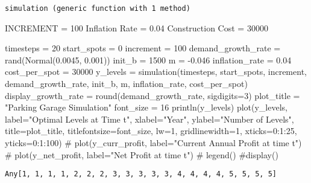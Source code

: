 \documentclass[
  letterpaper,
  DIV=11,
  numbers=noendperiod]{scrartcl}
\newenvironment{Shaded}{\begin{snugshade}}{\end{snugshade}}
\newcommand{\CommentTok}[1]{\textcolor[rgb]{0.37,0.37,0.37}{#1}}
\newcommand{\FloatTok}[1]{\textcolor[rgb]{0.68,0.00,0.00}{#1}}
\newcommand{\FunctionTok}[1]{\textcolor[rgb]{0.28,0.35,0.67}{#1}}
\newcommand{\NormalTok}[1]{\textcolor[rgb]{0.00,0.23,0.31}{#1}}
\newcommand{\OperatorTok}[1]{\textcolor[rgb]{0.37,0.37,0.37}{#1}}
\newcommand{\StringTok}[1]{\textcolor[rgb]{0.13,0.47,0.30}{#1}}
\begin{document}
\begin{verbatim}
simulation (generic function with 1 method)
\end{verbatim}

INCREMENT = 100 Inflation Rate = 0.04 Construction Cost = 30000

\begin{Shaded}
\begin{Highlighting}[]
\NormalTok{timesteps }\OperatorTok{=} \FloatTok{20} 
\NormalTok{start\_spots }\OperatorTok{=} \FloatTok{0}
\NormalTok{increment }\OperatorTok{=} \FloatTok{100}
\NormalTok{demand\_growth\_rate }\OperatorTok{=} \FunctionTok{rand}\NormalTok{(}\FunctionTok{Normal}\NormalTok{(}\FloatTok{0.0045}\NormalTok{, }\FloatTok{0.001}\NormalTok{))}
\NormalTok{init\_b }\OperatorTok{=} \FloatTok{1500}
\NormalTok{m }\OperatorTok{=} \OperatorTok{{-}}\FloatTok{0.046}
\NormalTok{inflation\_rate }\OperatorTok{=} \FloatTok{0.04}
\NormalTok{cost\_per\_spot }\OperatorTok{=} \FloatTok{30000}
\NormalTok{y\_levels }\OperatorTok{=} \FunctionTok{simulation}\NormalTok{(timesteps, start\_spots, increment, demand\_growth\_rate, init\_b, m, inflation\_rate, cost\_per\_spot)}
\NormalTok{display\_growth\_rate }\OperatorTok{=} \FunctionTok{round}\NormalTok{(demand\_growth\_rate, sigdigits}\OperatorTok{=}\FloatTok{3}\NormalTok{)}
\NormalTok{plot\_title }\OperatorTok{=} \StringTok{"Parking Garage Simulation"}
\NormalTok{font\_size }\OperatorTok{=} \FloatTok{16}
\FunctionTok{println}\NormalTok{(y\_levels)}
\FunctionTok{plot}\NormalTok{(y\_levels, label}\OperatorTok{=}\StringTok{"Optimal Levels at Time t"}\NormalTok{, xlabel}\OperatorTok{=}\StringTok{"Year"}\NormalTok{, ylabel}\OperatorTok{=}\StringTok{"Number of Levels"}\NormalTok{,}
\NormalTok{title}\OperatorTok{=}\NormalTok{plot\_title, titlefontsize}\OperatorTok{=}\NormalTok{font\_size, lw}\OperatorTok{=}\FloatTok{1}\NormalTok{, gridlinewidth}\OperatorTok{=}\FloatTok{1}\NormalTok{, xticks}\OperatorTok{=}\FloatTok{0}\OperatorTok{:}\FloatTok{1}\OperatorTok{:}\FloatTok{25}\NormalTok{, yticks}\OperatorTok{=}\FloatTok{0}\OperatorTok{:}\FloatTok{1}\OperatorTok{:}\FloatTok{100}\NormalTok{)}
\CommentTok{\# plot(y\_curr\_profit, label="Current Annual Profit at time t")}
\CommentTok{\# plot(y\_net\_profit, label="Net Profit at time t")}
\CommentTok{\# legend()}
\CommentTok{\#display()}
\end{Highlighting}
\end{Shaded}

\begin{verbatim}
Any[1, 1, 1, 1, 2, 2, 2, 3, 3, 3, 3, 3, 4, 4, 4, 4, 5, 5, 5, 5]
\end{verbatim}
\end{document}
